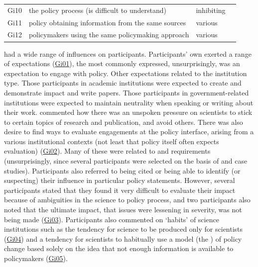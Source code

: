 \begin{table}[!ht]
\begin{tabular}{L{.07\linewidth}L{.3\linewidth}L{.11\linewidth}L{.52\linewidth}}
Gi10 & the policy process (is difficult to understand) & inhibiting &  \\
Gi11 & policy obtaining information from the same sources & various &  \\
Gi12 & policymakers using the same policymaking approach & various &  \\
\hline
\end{tabular}
\end{table}

\skiinst{} had a wide range of influences on participants. Participants' own \skiinst{} exerted a range of expectations (\hyperref[tab:resskiinst]{Gi01}), the most commonly expressed, unsurprisingly, was an expectation to engage with policy. Other expectations related to the institution type. Those participants in academic institutions were expected to create and demonstrate impact and write papers. Those participants in government-related institutions were expected to maintain neutrality when speaking or writing about their work.  commented how there was an unspoken pressure on scientists to stick to certain topics of research and publication, and avoid others. There was also desire to find ways to evaluate engagements at the policy interface, arising from a various institutional contexts (not least that policy itself often expects evaluation) (\hyperref[tab:resskiinst]{Gi02}). Many of these were related to \REF{} and \UKRI{} requirements (unsurprisingly, since several participants were selected on the basis of \REF{} and \UKRI{} case studies). Participants also referred to being cited or being able to identify (or suspecting) their influence in particular policy statements. However, several participants stated that they found it very difficult to evaluate their impact because of ambiguities in the science to policy process, and two participants also noted that the ultimate impact, that \CAN{} issues were lessening in severity, was not being made (\hyperref[tab:resskiinst]{Gi03}). Participants also commented on `habits' of science institutions such as the tendency for science to be produced only for scientists (\hyperref[tab:resskiinst]{Gi04}) and a tendency for scientists to habitually use a model (the \IDM) of policy change based solely on the idea that not enough information is available to policymakers (\hyperref[tab:resskiinst]{Gi05}). 

